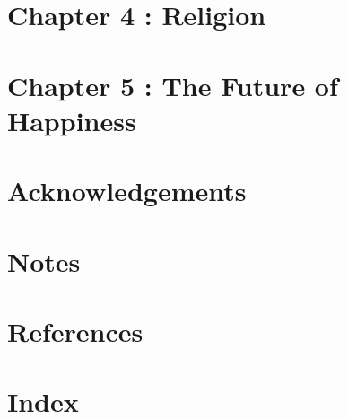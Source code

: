\documentclass[a4paper,14pt]{extbook}
\begin{document}
\newpage
\section{Chapter 4 : Religion}

\newpage
\section{Chapter 5 : The Future of Happiness}

\newpage
\section{Acknowledgements}

\newpage
\section{Notes}

\newpage
\section{References}

\newpage
\section{Index}
\end{document}
